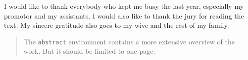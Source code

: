 \documentclass[master=cws,masteroption=se,english,oneside]{kulemt}
\begin{document}
\begin{preface}
    I would like to thank everybody who kept me busy the last year,
    especially my promotor and my assistants. I would also like to thank the
    jury for reading the text. My sincere gratitude also goes to my wive and
    the rest of my family.
\end{preface}

\tableofcontents*

\begin{abstract}
    The \texttt{abstract} environment contains a more extensive overview of
    the work. But it should be limited to one page.
\end{abstract}



\end{document}

